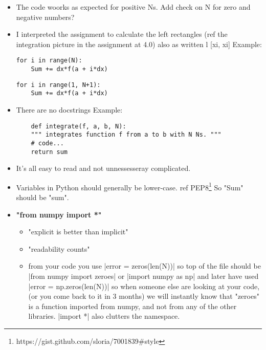 \documentclass[a4paper]{article}
\begin{document}
\begin{itemize}

  \item The code woorks as expected for positive Ns. Add check on N for zero and negative numbers?
  \item I interpreted the assignment to calculate the left rectangles (ref the integration picture in the assignment at 4.0) also as written l [xi, xi]
  \newline
  Example:
  \begin{verbatim}
for i in range(N):
    Sum += dx*f(a + i*dx)  
  \end{verbatim}
  \begin{verbatim}
for i in range(1, N+1):
    Sum += dx*f(a + i*dx)
	\end{verbatim}

  
 
  \item There are no docstrings
  	\newline
  	Example:
  	\begin{verbatim}
    def integrate(f, a, b, N):
	""" integrates function f from a to b with N Ns. """
	# code...
	return sum
    \end{verbatim}

  
  \item It's all easy to read and not unnessesseray complicated.
  \item Variables in Python should generally be lower-case. ref PEP8\footnote{https://gist.github.com/sloria/7001839\#style}
  So "Sum" should be "sum".
  \item \textbf{"from numpy import *"}
  \begin{itemize}
  \item "explicit is better than implicit"
  \item "readability counts"
  \item from your code you use |error = zeros(len(N))|
so top of the file should be |from numpy import zeroes| or |import numpy as np| and later have used |error = np.zeros(len(N))|
so when someone else are looking at your code, (or you come back to it in 3 months)
we will instantly know that "zeroes" is a function imported from numpy, and not from any of the other libraries.
|import *| also clutters the namespace.
  \end{itemize}

\end{itemize}
\end{document}
